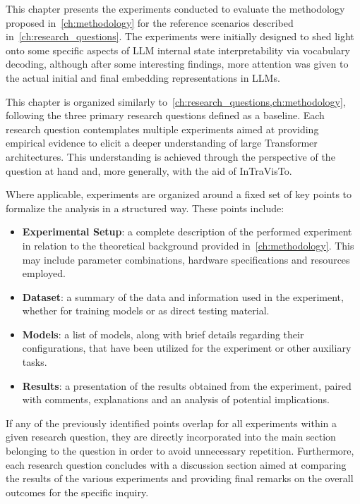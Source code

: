 This chapter presents the experiments conducted to evaluate the methodology proposed in~\cref{ch:methodology} for the reference scenarios described in~\cref{ch:research_questions}.
The experiments were initially designed to shed light onto some specific aspects of LLM internal state interpretability via vocabulary decoding, although after some interesting findings, more attention was given to the actual initial and final embedding representations in LLMs.

This chapter is organized similarly to~\cref{ch:research_questions,ch:methodology}, following the three primary research questions defined as a baseline.
Each research question contemplates multiple experiments aimed at providing empirical evidence to elicit a deeper understanding of large Transformer architectures.
This understanding is achieved through the perspective of the question at hand and, more generally, with the aid of InTraVisTo.

Where applicable, experiments are organized around a fixed set of key points to formalize the analysis in a structured way.
These points include:
\begin{itemize}
    \item \textbf{Experimental Setup}: a complete description of the performed experiment in relation to the theoretical background provided in~\cref{ch:methodology}.
This may include parameter combinations, hardware specifications and resources employed.
    \item \textbf{Dataset}: a summary of the data and information used in the experiment, whether for training models or as direct testing material.
    \item \textbf{Models}: a list of models, along with brief details regarding their configurations, that have been utilized for the experiment or other auxiliary tasks.
    \item \textbf{Results}: a presentation of the results obtained from the experiment,  paired with comments, explanations and an analysis of potential implications.
\end{itemize}
If any of the previously identified points overlap for all experiments within a given research question, they are directly incorporated into the main section belonging to the question in order to avoid unnecessary repetition.
Furthermore, each research question concludes with a discussion section aimed at comparing the results of the various experiments and providing final remarks on the overall outcomes for the specific inquiry.

